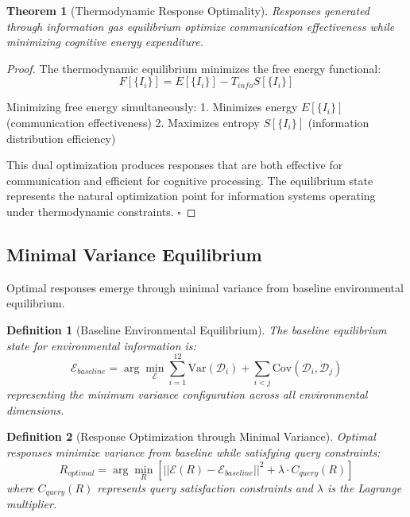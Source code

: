 \documentclass[12pt,a4paper]{article}
\newtheorem{theorem}{Theorem}
\newtheorem{definition}{Definition}
\begin{document}
\begin{theorem}[Thermodynamic Response Optimality]
Responses generated through information gas equilibrium optimize communication effectiveness while minimizing cognitive energy expenditure.
\end{theorem}

\begin{proof}
The thermodynamic equilibrium minimizes the free energy functional:
\begin{equation}
F[\{I_i\}] = E[\{I_i\}] - T_{info} S[\{I_i\}]
\end{equation}

Minimizing free energy simultaneously:
1. Minimizes energy $E[\{I_i\}]$ (communication effectiveness)
2. Maximizes entropy $S[\{I_i\}]$ (information distribution efficiency)

This dual optimization produces responses that are both effective for communication and efficient for cognitive processing. The equilibrium state represents the natural optimization point for information systems operating under thermodynamic constraints. $\square$
\end{proof}

\subsection{Minimal Variance Equilibrium}

Optimal responses emerge through minimal variance from baseline environmental equilibrium.

\begin{definition}[Baseline Environmental Equilibrium]
The baseline equilibrium state for environmental information is:
\begin{equation}
\mathcal{E}_{baseline} = \arg\min_{\mathcal{E}} \sum_{i=1}^{12} \text{Var}(\mathcal{D}_i) + \sum_{i<j} \text{Cov}(\mathcal{D}_i, \mathcal{D}_j)
\end{equation}
representing the minimum variance configuration across all environmental dimensions.
\end{definition}

\begin{definition}[Response Optimization through Minimal Variance]
Optimal responses minimize variance from baseline while satisfying query constraints:
\begin{equation}
R_{optimal} = \arg\min_R \left[||\mathcal{E}(R) - \mathcal{E}_{baseline}||^2 + \lambda \cdot C_{query}(R)\right]
\end{equation}
where $C_{query}(R)$ represents query satisfaction constraints and $\lambda$ is the Lagrange multiplier.
\end{definition}
\end{document}
